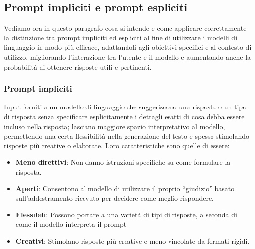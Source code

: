     \subsection{Prompt impliciti e prompt espliciti}
        Vediamo ora in questo paragrafo cosa si intende e come applicare correttamente la distinzione tra prompt impliciti ed espliciti al fine di utilizzare i modelli di linguaggio in modo più efficace, adattandoli agli obiettivi specifici e al contesto di utilizzo, migliorando l'interazione tra l'utente e il modello e aumentando anche la probabilità di ottenere risposte utili e pertinenti.
        
        \subsubsection{Prompt impliciti}
            Input forniti a un modello di linguaggio che suggeriscono una risposta o un tipo di risposta senza specificare esplicitamente i dettagli esatti di cosa debba essere incluso nella risposta; lasciano maggiore spazio interpretativo al modello, permettendo una certa flessibilità nella generazione del testo e spesso stimolando risposte più creative o elaborate. Loro caratteristiche sono quelle di essere:
            \begin{itemize}
                \item \textbf{Meno direttivi}: Non danno istruzioni specifiche su come formulare la risposta.
                
                \item \textbf{Aperti}: Consentono al modello di utilizzare il proprio ``giudizio'' basato sull'addestramento ricevuto per decidere come meglio rispondere.
                
                \item \textbf{Flessibili}: Possono portare a una varietà di tipi di risposte, a seconda di come il modello interpreta il prompt.
                
                \item \textbf{Creativi}: Stimolano risposte più creative e meno vincolate da formati rigidi.
            \end{itemize}
            
